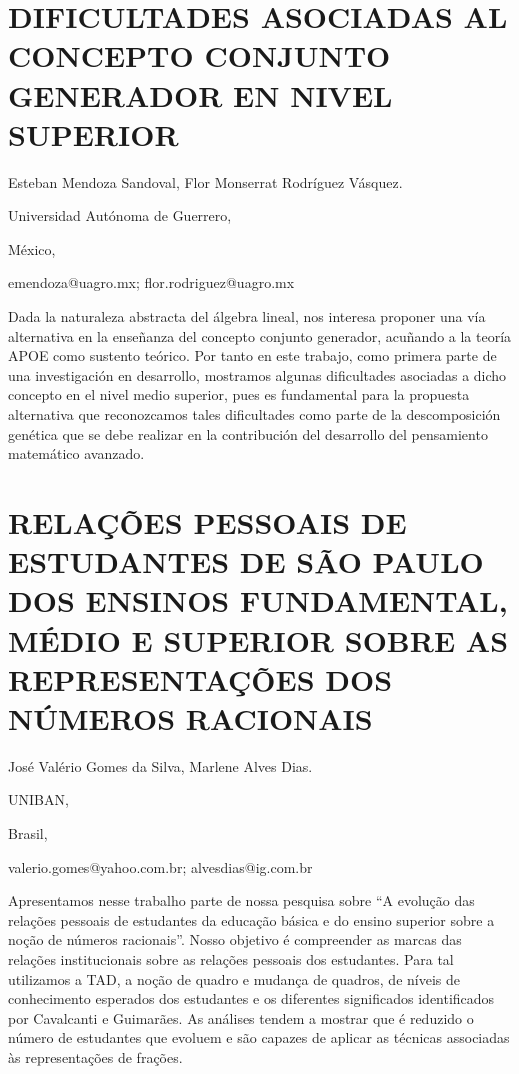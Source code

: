 \section{DIFICULTADES ASOCIADAS AL CONCEPTO CONJUNTO GENERADOR EN NIVEL SUPERIOR}

\begin{datos}

Esteban Mendoza Sandoval, Flor Monserrat Rodríguez Vásquez.

Universidad Autónoma de Guerrero, 

México,

emendoza@uagro.mx; flor.rodriguez@uagro.mx 

\end{datos}

Dada la naturaleza abstracta del álgebra lineal, nos interesa proponer
una vía alternativa en la enseñanza del concepto conjunto generador,
acuñando a la teoría APOE como sustento teórico. Por tanto en este
trabajo, como primera parte de una investigación en desarrollo, mostramos
algunas dificultades asociadas a dicho concepto en el nivel medio
superior, pues es fundamental para la propuesta alternativa que reconozcamos
tales dificultades como parte de la descomposición genética que se
debe realizar en la contribución del desarrollo del pensamiento matemático
avanzado. 


\section{RELAÇÕES PESSOAIS DE ESTUDANTES DE SÃO PAULO DOS ENSINOS FUNDAMENTAL,
MÉDIO E SUPERIOR SOBRE AS REPRESENTAÇÕES DOS NÚMEROS RACIONAIS}

\begin{datos}

José Valério Gomes da Silva, Marlene Alves Dias.

UNIBAN,

Brasil,

valerio.gomes@yahoo.com.br; alvesdias@ig.com.br

\end{datos}

Apresentamos nesse trabalho parte de nossa pesquisa sobre “A evolução
das relações pessoais de estudantes da educação básica e do ensino
superior sobre a noção de números racionais”. Nosso objetivo é compreender
as marcas das relações institucionais sobre as relações pessoais dos
estudantes. Para tal utilizamos a TAD, a noção de quadro e mudança
de quadros, de níveis de conhecimento esperados dos estudantes e os
diferentes significados identificados por Cavalcanti e Guimarães.
As análises tendem a mostrar que é reduzido o número de estudantes
que evoluem e são capazes de aplicar as técnicas associadas às representações
de frações. 


